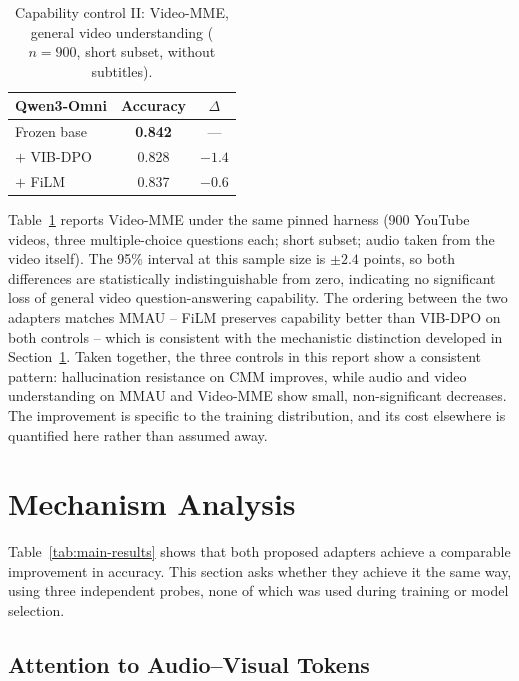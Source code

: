 \documentclass[11pt,a4paper,oneside]{article}
\begin{document}
\begin{table}[h]
\centering
\small
\begin{tabular}{lcc}
\toprule
Qwen3-Omni & Accuracy & $\Delta$ \\
\midrule
Frozen base  & \textbf{0.842} & --- \\
$+$ VIB-DPO & 0.828 & $-1.4$ \\
$+$ FiLM     & 0.837 & $-0.6$ \\
\bottomrule
\end{tabular}
\caption{Capability control II: Video-MME, general video understanding ($n=900$, short subset,
without subtitles).}
\label{tab:videomme}
\end{table}

Table~\ref{tab:videomme} reports Video-MME under the same pinned harness (900 YouTube videos, three
multiple-choice questions each; short subset; audio taken from the video itself). The 95\% interval
at this sample size is $\pm2.4$ points, so both differences are statistically indistinguishable from
zero, indicating no significant loss of general video question-answering capability. The ordering
between the two adapters matches MMAU -- FiLM preserves capability better than VIB-DPO on both
controls -- which is consistent with the mechanistic distinction developed in
Section~\ref{sec:mechanism}. Taken together, the three controls in this report show a consistent
pattern: hallucination resistance on CMM improves, while audio and video understanding on MMAU and
Video-MME show small, non-significant decreases. The improvement is specific to the training
distribution, and its cost elsewhere is quantified here rather than assumed away.

\clearpage
\section{Mechanism Analysis}
\label{sec:mechanism}

Table~\ref{tab:main-results} shows that both proposed adapters achieve a comparable improvement in
accuracy. This section asks whether they achieve it the same way, using three independent probes,
none of which was used during training or model selection.

\subsection{Attention to Audio--Visual Tokens}
\label{sec:attention}
\end{document}
